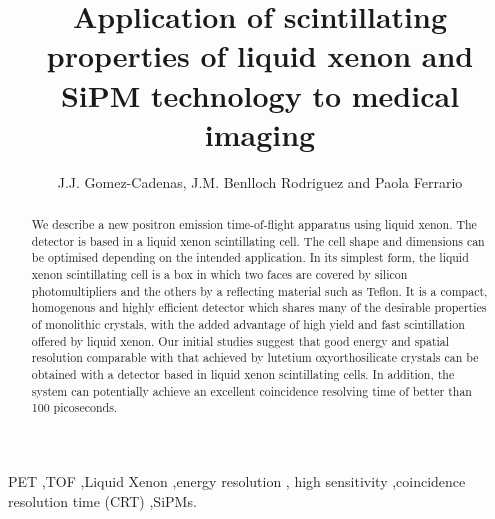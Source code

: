 \documentclass[review]{elsarticle}
\begin{document}
\begin{frontmatter}

\title{Application of scintillating properties of liquid xenon and SiPM technology to medical imaging}


\author{J.J. Gomez-Cadenas, J.M. Benlloch Rodriguez and Paola Ferrario}
\address{IFIC (U. Valencia/CSIC)}

%
%

\begin{abstract}
We describe a new positron emission time-of-flight apparatus using liquid xenon. The detector is based in a liquid xenon scintillating cell. The cell shape and dimensions can be optimised depending on the intended application. In its simplest form, the liquid xenon scintillating cell is a box in which two faces are covered by silicon photomultipliers and the others by a reflecting material such as Teflon. It is a compact, homogenous and highly efficient detector which shares many of the desirable properties of monolithic crystals, with the added advantage of high yield and fast scintillation offered by liquid xenon. Our initial studies suggest that good energy and spatial resolution comparable with that achieved by lutetium oxyorthosilicate crystals can be obtained with a detector based in liquid xenon scintillating cells. In addition, the system can potentially achieve an excellent coincidence resolving time of better than 100 picoseconds. 
\end{abstract}

\begin{keyword}
PET \sep TOF \sep Liquid Xenon \sep energy resolution \sep
 high sensitivity \sep coincidence resolution time (CRT) \sep SiPMs.
\end{keyword}

\end{frontmatter}
\end{document}
